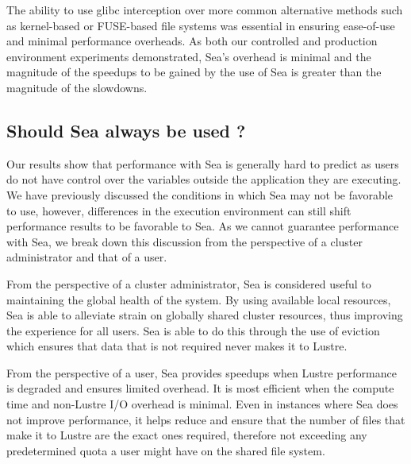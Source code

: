 \documentclass[fleqn,10pt]{wlscirep}
\begin{document}
    The ability to use glibc interception over more common alternative methods
    such as kernel-based or FUSE-based file systems was essential in ensuring
    ease-of-use and minimal performance overheads. As both our controlled and
    production environment experiments demonstrated, Sea's overhead is minimal
    and the magnitude of the speedups to be gained by the use of Sea is
    greater than the magnitude of the slowdowns.
    
    \subsection{Should Sea always be used ?}
    
    Our results show that performance with Sea is generally hard to predict as
    users do not have control over the variables outside the application they
    are executing. We have previously discussed the conditions in which Sea may
    not be favorable to use, however, differences in the execution environment
    can still shift performance results to be favorable to Sea. As we cannot
    guarantee performance with Sea, we break down this discussion from the
    perspective of a cluster administrator and that of a user.

    From the perspective of a cluster administrator, Sea is considered useful to
    maintaining the global health of the system. By using available local
    resources, Sea is able to alleviate strain on globally shared cluster
    resources, thus improving the experience for all users. Sea is able to do
    this through the use of eviction which ensures that data that is not
    required never makes it to Lustre.


    From the perspective of a user, Sea provides speedups when
    Lustre performance is degraded and ensures limited overhead. It is most efficient
    when the compute time and non-Lustre I/O overhead is minimal. Even in
    instances where Sea does not improve performance, it helps reduce and ensure
    that the number of files that make it to Lustre are the exact ones required,
    therefore not exceeding any predetermined quota a user might have on the
    shared file system. 
    
    
    
    
    
    
    
\end{document}
